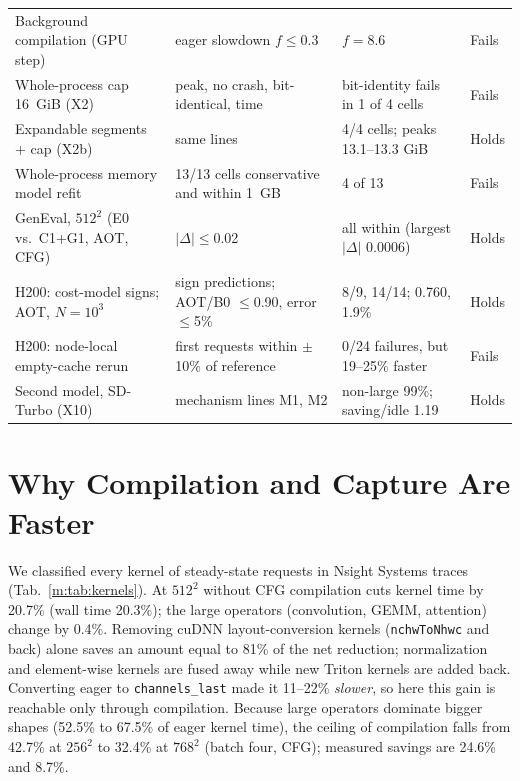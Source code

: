 \documentclass[conference]{IEEEtran}
\newcommand{\tn}[1]{#1}%
\begin{document}
\begin{table}[t]
\begin{tabularx}{\textwidth}{@{}P{3.6cm}P{3.6cm}YP{1.4cm}@{}}
Background compilation (GPU step) & eager slowdown $f\le$0.3 & $f{=}$\tn{8.6} & Fails\\
Whole-process cap 16~GiB (X2) & peak, no crash, bit-identical, time & bit-identity fails in 1 of 4 cells & Fails\\
Expandable segments + cap (X2b) & same lines & 4/4 cells; peaks \tn{13.1--13.3 GiB} & Holds\\
Whole-process memory model refit & 13/13 cells conservative and within 1~GB & \tn{4} of 13 & Fails\\
GenEval, $512^2$ (E0 vs.\ C1+G1, AOT, CFG) & $|\Delta|\le$0.02 & all within (largest $|\Delta|$ \tn{0.0006}) & Holds\\
H200: cost-model signs; AOT, $N{=}10^3$ & sign predictions; AOT/B0 $\le$0.90, error $\le$5\% & \tn{8/9}, \tn{14/14}; \tn{0.760}, \tn{1.9\%} & Holds\\
H200: node-local empty-cache rerun & first requests within $\pm$10\% of reference & \tn{0/24} failures, but \tn{19--25\%} faster & Fails\\
Second model, SD-Turbo (X10) & mechanism lines M1, M2 & non-large \tn{99\%}; saving/idle \tn{1.19} & Holds\\
\bottomrule
\end{tabularx}
\end{table}

\section{Why Compilation and Capture Are Faster}\label{m:mech}
We classified every kernel of steady-state requests in Nsight Systems traces (Tab.~\ref{m:tab:kernels}). At $512^2$ without CFG compilation cuts kernel time by \tn{20.7\%} (wall time \tn{20.3\%}); the large operators (convolution, GEMM, attention) change by \tn{0.4\%}. Removing cuDNN layout-conversion kernels (\texttt{nchwToNhwc} and back) alone saves an amount equal to \tn{81\%} of the net reduction; normalization and element-wise kernels are fused away while new Triton kernels are added back. Converting eager to \texttt{channels\_last} made it \tn{11--22\%} \emph{slower}, so here this gain is reachable only through compilation. Because large operators dominate bigger shapes (\tn{52.5\%} to \tn{67.5\%} of eager kernel time), the ceiling of compilation falls from \tn{42.7\%} at $256^2$ to \tn{32.4\%} at $768^2$ (batch four, CFG); measured savings are \tn{24.6\%} and \tn{8.7\%}.
\end{document}
